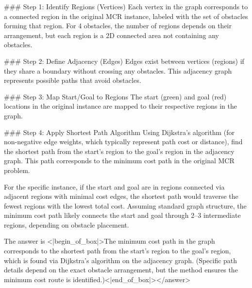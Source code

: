 ### Step 1: Identify Regions (Vertices)  
Each vertex in the graph corresponds to a connected region in the original MCR instance, labeled with the set of obstacles forming that region. For 4 obstacles, the number of regions depends on their arrangement, but each region is a 2D connected area not containing any obstacles.  

### Step 2: Define Adjacency (Edges)  
Edges exist between vertices (regions) if they share a boundary without crossing any obstacles. This adjacency graph represents possible paths that avoid obstacles.  

### Step 3: Map Start/Goal to Regions  
The start (green) and goal (red) locations in the original instance are mapped to their respective regions in the graph.  

### Step 4: Apply Shortest Path Algorithm  
Using Dijkstra’s algorithm (for non-negative edge weights, which typically represent path cost or distance), find the shortest path from the start’s region to the goal’s region in the adjacency graph. This path corresponds to the minimum cost path in the original MCR problem.  

For the specific instance, if the start and goal are in regions connected via adjacent regions with minimal cost edges, the shortest path would traverse the fewest regions with the lowest total cost. Assuming standard graph structure, the minimum cost path likely connects the start and goal through 2–3 intermediate regions, depending on obstacle placement.  

The answer is <|begin_of_box|>The minimum cost path in the graph corresponds to the shortest path from the start’s region to the goal’s region, which is found via Dijkstra’s algorithm on the adjacency graph. (Specific path details depend on the exact obstacle arrangement, but the method ensures the minimum cost route is identified.)<|end_of_box|></answer>